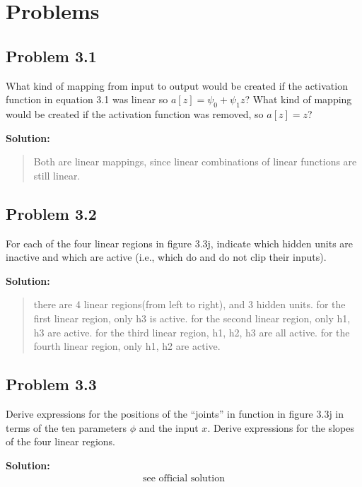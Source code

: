 \documentclass{article}
\begin{document}
\section*{Problems}

    \subsection*{Problem 3.1}
    What kind of mapping from input to output would be created if the activation function in equation 3.1 was linear so $a[z] = \psi_0 + \psi_1z$? What kind of mapping would be created if the activation function was removed, so $a[z] = z$?

        \vspace{1cm}
        \textbf{Solution:}
        \begin{quote}
            Both are linear mappings, since linear combinations of linear functions are still linear.
        \end{quote}

    \subsection*{Problem 3.2}
    For each of the four linear regions in figure 3.3j, indicate which hidden units are inactive and which are active (i.e., which do and do not clip their inputs).

        \vspace{1cm}
        \textbf{Solution:}
        \begin{quote}
            there are 4 linear regions(from left to right), and 3 hidden units.
            for the first linear region, only h3 is active.
            for the second linear region, only h1, h3 are active.
            for the third linear region, h1, h2, h3 are all active.
            for the fourth linear region, only h1, h2 are active.
        \end{quote}

    \subsection*{Problem 3.3}
    Derive expressions for the positions of the “joints” in function in figure 3.3j in terms of the ten parameters $\phi$ and the input $x$. Derive expressions for the slopes of the four linear regions.

        \vspace{1cm}
        \textbf{Solution:}
        \begin{align*}
            \text{see official solution}
        \end{align*}
\end{document}
